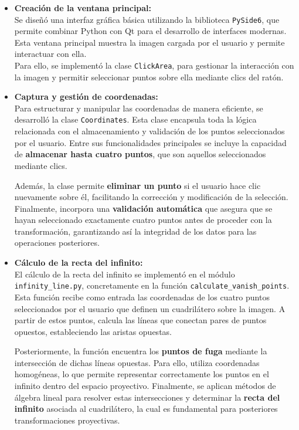 \begin{itemize}
    \item \textbf{Creación de la ventana principal:} \\
    Se diseñó una interfaz gráfica básica utilizando la biblioteca \texttt{PySide6}, que permite combinar Python con Qt para el desarrollo de interfaces modernas. Esta ventana principal muestra la imagen cargada por el usuario y permite interactuar con ella. \\
    Para ello, se implementó la clase \texttt{ClickArea}, para gestionar la interacción con la imagen y permitir seleccionar puntos sobre ella mediante clics del ratón.
    
    \item \textbf{Captura y gestión de coordenadas:} \\
    Para estructurar y manipular las coordenadas de manera eficiente, se desarrolló la clase \texttt{Coordinates}. Esta clase encapsula toda la lógica relacionada con el almacenamiento y validación de los puntos seleccionados por el usuario. Entre sus funcionalidades principales se incluye la capacidad de \textbf{almacenar hasta cuatro puntos}, que son aquellos seleccionados mediante clics.
    
    Además, la clase permite \textbf{eliminar un punto} si el usuario hace clic nuevamente sobre él, facilitando la corrección y modificación de la selección. Finalmente, incorpora una \textbf{validación automática} que asegura que se hayan seleccionado exactamente cuatro puntos antes de proceder con la transformación, garantizando así la integridad de los datos para las operaciones posteriores.
    
    
    \item \textbf{Cálculo de la recta del infinito:} \\
    El cálculo de la recta del infinito se implementó en el módulo \texttt{infinity\_line.py}, concretamente en la función \texttt{calculate\_vanish\_points}. Esta función recibe como entrada las coordenadas de los cuatro puntos seleccionados por el usuario que definen un cuadrilátero sobre la imagen. A partir de estos puntos, calcula las líneas que conectan pares de puntos opuestos, estableciendo las aristas opuestas.
    
    Posteriormente, la función encuentra los \textbf{puntos de fuga} mediante la intersección de dichas líneas opuestas. Para ello, utiliza coordenadas homogéneas, lo que permite representar correctamente los puntos en el infinito dentro del espacio proyectivo. Finalmente, se aplican métodos de álgebra lineal para resolver estas intersecciones y determinar la \textbf{recta del infinito} asociada al cuadrilátero, la cual es fundamental para posteriores transformaciones proyectivas.
    

\end{itemize}

